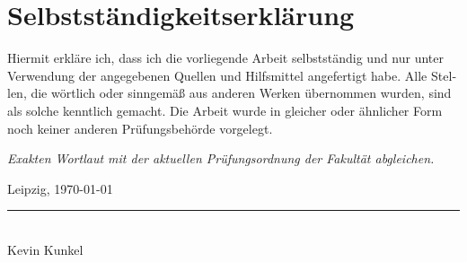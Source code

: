 \documentclass[12pt, a4paper]{book}
\newcommand{\thesisAuthor}{Kevin Kunkel}
\newcommand{\thesisDate}{\today}
\newcommand{\plan}[1]{{\color{gray}\itshape #1\par}}
\begin{document}
\chapter*{Selbstständigkeitserklärung}
\begin{otherlanguage}{ngerman}
Hiermit erkläre ich, dass ich die vorliegende Arbeit selbstständig und nur unter
Verwendung der angegebenen Quellen und Hilfsmittel angefertigt habe. Alle Stellen,
die wörtlich oder sinngemäß aus anderen Werken übernommen wurden, sind als solche
kenntlich gemacht. Die Arbeit wurde in gleicher oder ähnlicher Form noch keiner
anderen Prüfungsbehörde vorgelegt.
\plan{Exakten Wortlaut mit der aktuellen Prüfungsordnung der Fakultät abgleichen.}

\vspace{2cm}
\noindent Leipzig, \thesisDate \hfill \rule{6cm}{0.4pt}\\
\hspace*{\fill}\thesisAuthor
\end{otherlanguage}
\end{document}
